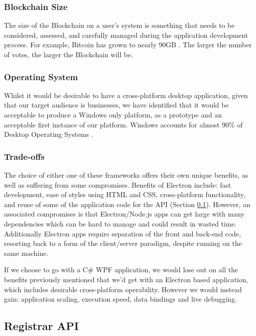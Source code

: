 \documentclass{article}
\begin{document}
\subsubsection{Blockchain Size}

The size of the Blockchain on a user's system is something that needs to be considered, assessed, and carefully managed during the application development process. For example, Bitcoin has grown to nearly 90GB \parencite{blockchaininfosize}. The larger the number of votes, the larger the Blockchain will be.

\subsubsection{Operating System}

Whilst it would be desirable to have a cross-platform desktop application, given that our target audience is businesses,  we have identified that it would be acceptable to produce a Windows only platform, as a prototype and an acceptable first instance of our platform. Windows accounts for almost 90\% of Desktop Operating Systems \parencite{operatingsystemstats}.

\subsubsection{Trade-offs}

The choice of either one of these frameworks offers their own unique benefits, as well as suffering from some compromises. Benefits of Electron include: fast development, ease of styles using HTML and CSS, cross-platform functionality, and reuse of some of the application code for the API (Section \ref{section:registrar-api}). However, an associated compromises is that Electron/Node.js apps can get large with many dependencies which can be hard to manage and could result in wasted time. Additionally Electron apps require separation of the front and back-end code, resorting back to a form of the client/server paradigm, despite running on the same machine.

\par

If we choose to go with a C\# WPF application, we would lose out on all the benefits previously mentioned that we'd get with an Electron based application, which includes desirable cross-platform operability. However we would instead gain: application scaling, execution speed, data bindings and live debugging.

\subsection{Registrar API}
\label{section:registrar-api}
\end{document}
